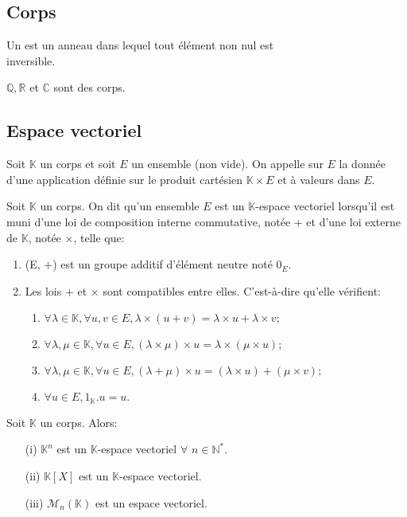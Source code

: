 \subsection{Corps}
\begin{madefinition}
	Un  est un anneau dans lequel tout élément non nul est\\ inversible.
\end{madefinition}
\begin{monexemple}
	$\mathbb{Q}, \mathbb{R}$ et $\mathbb{C}$ sont des corps. 
\end{monexemple}
\subsection{Espace vectoriel}
\begin{madefinition}
	Soit $\mathbb{K}$ un corps et soit $E$ un ensemble (non vide). On appelle  sur $E$ la donnée d'une application définie sur le produit cartésien $\mathbb{K} \times E$ et à valeurs dans $E$.
\end{madefinition}
\begin{madefinition}
	Soit $\mathbb{K}$ un corps. On dit qu’un ensemble $E$ est un $\mathbb{K}$-espace vectoriel lorsqu’il est muni d’une loi de composition interne commutative, notée + et d’une loi externe de $\mathbb{K}$, notée $\times$, telle que:
	\begin{enumerate}
		\item (E, $+$) est un groupe additif d'élément neutre noté $0_E$.
		\item Les lois $+$ et $\times$ sont compatibles entre elles. C'est-à-dire qu'elle vérifient:
		\begin{enumerate}
			\item  $\forall \lambda \in \mathbb{K}, \forall u,v \in E, \lambda \times (u+v) = \lambda \times u + \lambda \times v;$
			\item $\forall \lambda , \mu \in \mathbb{K}, \forall u \in E, (\lambda \times \mu)\times u	= \lambda \times(\mu \times u);$
			\item $\forall \lambda, \mu \in \mathbb{K}, \forall u \in E, (\lambda + \mu)\times u = (\lambda \times u) + (\mu \times v);$
			\item  $\forall u \in E, 1_{\mathbb{K}}.u=u.$
		\end{enumerate}
	\end{enumerate}	
\end{madefinition}
\begin{monexemple}
		Soit $\mathbb{K}$ un corps. Alors: 
		\begin{enumerate}
			\item[(i)] $\mathbb{K}^n$ est un $\mathbb{K}$-espace vectoriel $ \forall $  $n \in \mathbb{N}^{*}$.
			\item[(ii)] $\mathbb{K}[X]$ est un $\mathbb{K}$-espace vectoriel.
			\item[(iii)] $\mathcal{M}_n(\mathbb{K})$ est un espace vectoriel.
		\end{enumerate}
\end{monexemple}

